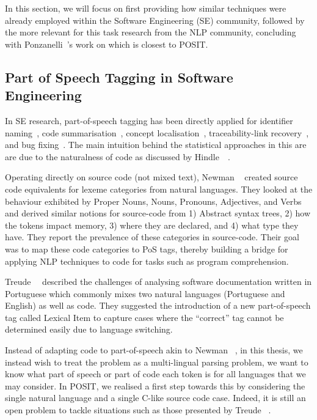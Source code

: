 In this section, we will focus on first providing how similar techniques were
already employed within the Software Engineering (SE) community, followed by the
more relevant for this task research from the NLP community, concluding with
Ponzanelli~\etal's work on \SO which is closest to POSIT.

\subsection{Part of Speech Tagging in Software Engineering}
\label{chapter:literature:sec:posit_rel_work:pos4se}

In SE research, part-of-speech tagging has been directly applied for identifier
naming~\cite{Binkley2011}, code summarisation~\cite{Haiduc2010a, Haiduc2010b},
concept localisation~\cite{Abebe2010}, traceability-link
recovery~\cite{Capobianco2013}, and bug fixing~\cite{Tian2015}. The main
intuition behind the statistical approaches in this are are due to the
naturalness of code as discussed by Hindle~\etal~\cite{hindle2012naturalness}.

Operating directly on source code (not mixed text), Newman
\etal~\cite{Newman2017} created source code equivalents for lexeme categories
from natural languages. They looked at the behaviour exhibited by Proper Nouns,
Nouns, Pronouns, Adjectives, and Verbs and derived similar notions for
source-code from 1) Abstract syntax trees, 2) how the tokens impact memory, 3)
where they are declared, and 4) what type they have. They report the prevalence
of these categories in source-code. Their goal was to map these code categories
to PoS tags, thereby building a bridge for applying NLP techniques to code for
tasks such as program comprehension. 

Treude~\etal~\cite{Treude2015portuguese} described the challenges of analysing
software documentation written in Portuguese which commonly mixes two natural
languages (Portuguese and English) as well as code. They suggested the
introduction of a new part-of-speech tag called Lexical Item to capture cases
where the ``correct'' tag cannot be determined easily due to language switching.

Instead of adapting code to part-of-speech akin to Newman
\etal~\cite{Newman2017}, in this thesis, we instead wish to treat the problem as
a multi-lingual parsing problem, \ie we want to know what part of speech or part
of code each token is for all languages that we may consider. In POSIT, we
realised a first step towards this by considering the single natural language
and a single C-like source code case. Indeed, it is still an open problem to
tackle situations such as those presented by Treude
\etal~\cite{Treude2015portuguese}.

